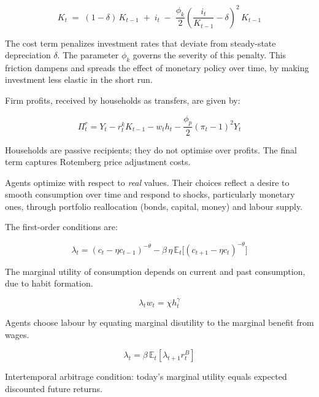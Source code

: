 \documentclass[11pt,preprint]{elsarticle}
\numberwithin{equation}{section}
\numberwithin{figure}{section}
\numberwithin{table}{section}
\begin{document}
\begin{equation}
K_t
\;=\;
(1 - \delta)\,K_{t-1}
\;+\; i_t
\;-\;\frac{\phi_k}{2}
\left(\frac{i_t}{K_{t-1}} - \delta\right)^{2}
\,K_{t-1}
\label{capital_accumulation_real}
\end{equation}

The cost term penalizes investment rates that deviate from steady-state
depreciation \(\delta\). The parameter \(\phi_k\) governs the severity
of this penalty. This friction dampens and spreads the effect of
monetary policy over time, by making investment less elastic in the
short run.

Firm profits, received by households as transfers, are given by:

\begin{equation}
\Pi^r_t = Y_t - r^k_t K_{t-1} - w_t h_t - \dfrac{\phi_p}{2} (\pi_t - 1)^2 Y_t
\label{intermediate_firm_profit_real}
\end{equation}

Households are passive recipients; they do not optimise over profits.
The final term captures Rotemberg price adjustment costs.

Agents optimize with respect to \emph{real} values. Their choices
reflect a desire to smooth consumption over time and respond to shocks,
particularly monetary ones, through portfolio reallocation (bonds,
capital, money) and labour supply.

The first-order conditions are:

\begin{equation}\label{foc_C}
\lambda_t = (c_t-\eta c_{t-1})^{-\theta} - \beta\,\eta\,\mathbb{E}_t\bigl[(c_{t+1}-\eta c_t)^{-\theta}\bigr]
\end{equation}

The marginal utility of consumption depends on current and past
consumption, due to habit formation.

\begin{equation}\label{foc_h}
\lambda_t w_t = \chi h_t^{\gamma}
\end{equation}

Agents choose labour by equating marginal disutility to the marginal
benefit from wages.

\begin{equation}\label{foc_B}
\lambda_t = \beta \, \mathbb{E}_t \left[ \lambda_{t+1} r^B_t \right]
\end{equation}

Intertemporal arbitrage condition: today's marginal utility equals
expected discounted future returns.
\end{document}
